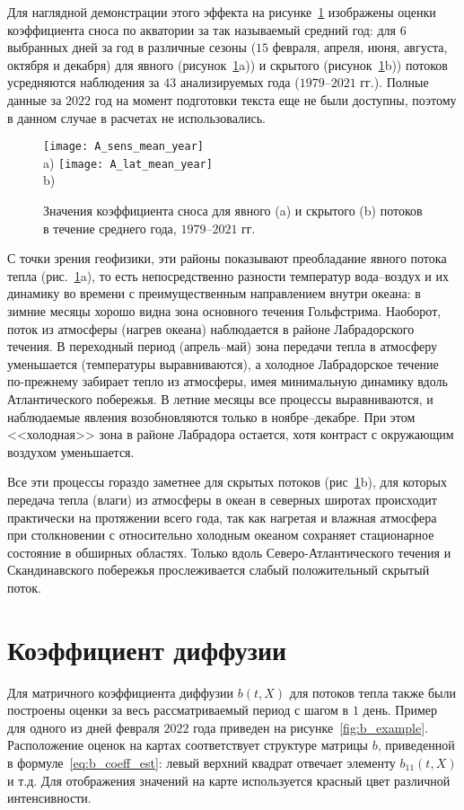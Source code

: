 Для наглядной демонстрации этого эффекта на рисунке~\ref{fig:ab_mean_year} изображены оценки коэффициента сноса по акватории за так называемый средний год: для $6$ выбранных дней за год в различные сезоны ($15$ февраля, апреля, июня, августа, октября и декабря) для явного (рисунок~\ref{fig:ab_mean_year}a)) и скрытого (рисунок~\ref{fig:ab_mean_year}b)) потоков усредняются наблюдения за $43$ анализируемых года ($1979$--$2021$ гг.). Полные данные за $2022$ год на момент подготовки текста еще не были доступны, поэтому в данном случае в расчетах не использовались.

\begin{figure}[h!]
	\centering
	\texttt{[image: A\_sens\_mean\_year]}\\
	a)
	\texttt{[image: A\_lat\_mean\_year]}\\
	b)
	
	\caption{Значения коэффициента сноса для явного (a) и скрытого (b) потоков в течение среднего года, $1979$--$2021$ гг.} 
	\label{fig:ab_mean_year}
\end{figure}

С точки зрения геофизики, эти районы показывают преобладание явного потока тепла (рис.~\ref{fig:ab_mean_year}a), то есть непосредственно разности температур вода--воздух и их динамику во времени с преимущественным направлением внутри океана: в зимние месяцы хорошо видна зона основного течения Гольфстрима. Наоборот, поток из атмосферы (нагрев океана) наблюдается в районе Лабрадорского течения. В переходный период (апрель--май) зона передачи тепла в атмосферу уменьшается (температуры выравниваются), а холодное Лабрадорское течение по-прежнему забирает тепло из атмосферы, имея минимальную динамику вдоль Атлантического побережья. В летние месяцы все процессы выравниваются, и наблюдаемые явления возобновляются только в ноябре--декабре. При этом <<холодная>> зона в районе Лабрадора остается, хотя контраст с окружающим воздухом уменьшается.

Все эти процессы гораздо заметнее для скрытых потоков (рис~\ref{fig:ab_mean_year}b), для которых передача тепла (влаги) из атмосферы в океан в северных широтах происходит практически на протяжении всего года, так как нагретая и влажная атмосфера при столкновении с относительно холодным океаном сохраняет стационарное состояние в обширных областях. Только вдоль Северо-Атлантического течения и Скандинавского побережья прослеживается слабый положительный скрытый поток. 

\section{Коэффициент диффузии}
Для матричного коэффициента диффузии $b(t,X)$ для потоков тепла также были построены оценки за весь рассматриваемый период с шагом в $1$ день. Пример для одного из дней февраля $2022$ года приведен на рисунке~\ref{fig:b_example}. Расположение оценок на картах соответствует структуре матрицы $b$, приведенной в формуле~\eqref{eq:b_coeff_est}: левый верхний квадрат отвечает элементу $b_{11}(t,X)$ и т.д. Для отображения значений на карте используется красный цвет различной интенсивности.

